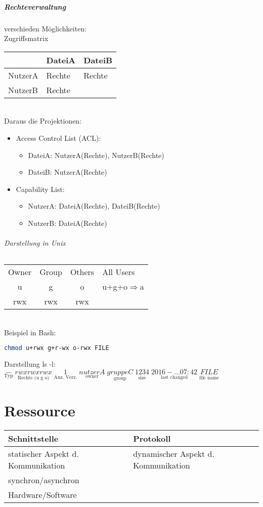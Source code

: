 \documentclass{scrreprt}
\renewcommand{\imptnt}[1]{#1}
\begin{document}
\paragraph{Rechteverwaltung} verschieden Möglichkeiten:\\
\imptnt{Zugriffsmatrix}\\
\begin{tabular}{l | l l }
& DateiA & DateiB\\
\hline
NutzerA & Rechte & Rechte\\
NutzerB & Rechte & 
\end{tabular}\\
Daraus die Projektionen:
\begin{itemize}
\item \imptnt{Access Control List (ACL)}:
\begin{itemize}
\item DateiA: NutzerA(Rechte), NutzerB(Rechte)
\item DateiB: NutzerA(Rechte)
\end{itemize}
\item \imptnt{Capability List}:
\begin{itemize}
\item NutzerA: DateiA(Rechte), DateiB(Rechte)
\item NutzerB: DateiA(Rechte)
\end{itemize}
\end{itemize}
\subparagraph{Darstellung in Unix} \parskp
\begin{tabular}{c | c | c l}
Owner & Group & Others & \quad All Users\\
u & g & o & \quad u+g+o$\Rightarrow$a\\
rwx & rwx & rwx
\end{tabular}\\
Beispiel in Bash:
\begin{lstlisting}[language=bash]
chmod u+rwx g+r-wx o-rwx FILE
\end{lstlisting}
Darstellung ls -l:\\
$\underset{\text{Typ}}{-}\;\underset{\text{Rechte (u g o)}}{rwxrwxrwx}\;\underset{\text{Anz. Verz.}}{1}\;\underset{\text{owner}}{nutzerA}\;\underset{\text{group}}{gruppeC}\;\underset{\text{size}}{1234}\;\underset{\text{last changed}}{2016-...07:42}\; \underset{\text{file name}}{FILE}$

\chapter{Ressource}
\begin{tabular}{l | l}
Schnittstelle & Protokoll\\
\hline
statischer Aspekt d. Kommunikation & dynamischer Aspekt d. Kommunikation\\
synchron/asynchron\\
Hardware/Software
\end{tabular}
\end{document}
